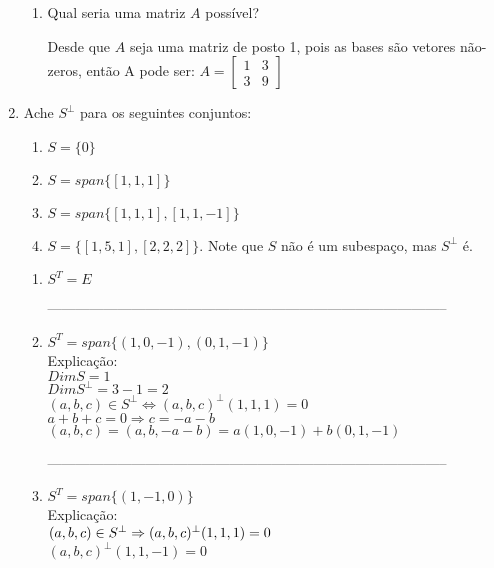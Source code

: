\documentclass[leqno]{article}
\begin{document}
\begin{enumerate}
\begin{enumerate}
			\item Qual seria uma matriz $A$ possível?
			
			\begin{sol} 
				  Desde que $A$ seja uma matriz de posto 1, pois as bases são vetores não-zeros, então A pode ser: $A = \begin{bmatrix}
				  	1 & 3 \\
				  	3 & 9 
				  \end{bmatrix}$
			\end{sol} 
			
		\end{enumerate}
		
		\item Ache $S^{\perp}$ para os seguintes conjuntos:
		
		\begin{enumerate}
			
			\item $S = \{0\}$
			
			\item $S = span\{[1,1,1]\}$
			
			\item $S = span\{[1,1,1], [1,1,-1]\}$
			
			\item $S = \{[1,5,1], [2,2,2]\}$. Note que $S$ não é um subespaço, mas $S^\perp$ é.
			
		\end{enumerate}
		
		\begin{sol}
			\vspace{-\baselineskip} 
			\begin{enumerate}    
				\item $S^T = E$
				
				
			--------------------------------------------------------------------------------------	 
				\item $S^T = span\{(1,0,-1),(0,1,-1)\}$\\
			Explicação:\\
			$DimS = 1$\\
			$DimS^{\perp} = 3 - 1 = 2$\\
			$(a, b, c) \in S^{\perp} \Longleftrightarrow (a, b, c)^{\perp}(1,1,1) = 0$\\
			$a + b + c = 0 \Rightarrow c = -a -b$\\
			$(a, b, c) = (a, b, -a-b) = a(1, 0, -1) + b(0, 1, -1)$
			
			--------------------------------------------------------------------------------------
				\item $S^T = span\{(1,-1,0)\}$\\
			Explicação:\\ 
			$(a,b,c) \in S^{\perp} \Rightarrow \\
			(a, b, c)^{\perp}(1,1,1) = 0$\\
			$(a, b, c)^{\perp}(1,1,-1) = 0$\\
			

\end{enumerate}
\end{sol}
\end{enumerate}
\end{document}
